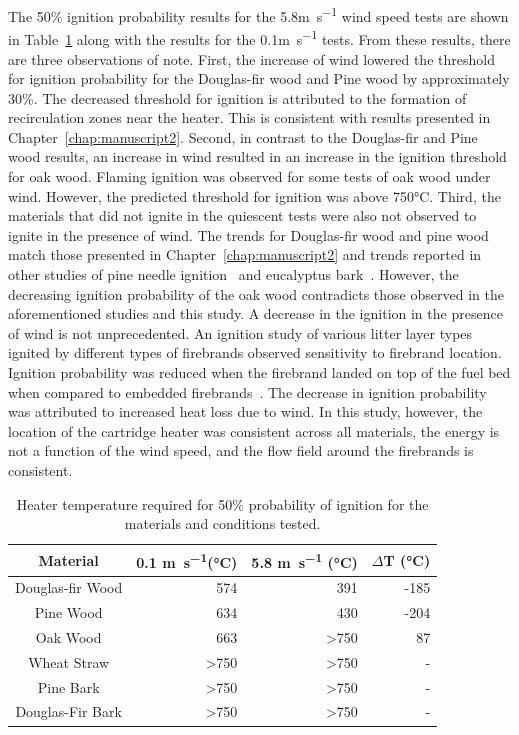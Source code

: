     The 50\% ignition probability results for the 5.8\si{\meter\per\second} wind speed tests are shown in Table~\ref{tab:composition50temp} along with the results for the 0.1\si{\meter\per\second} tests. From these results, there are three observations of note. First, the increase of wind lowered the threshold for ignition probability for the Douglas-fir wood and Pine wood by approximately 30\%. The decreased threshold for ignition  is attributed to the formation of recirculation zones near the heater. This is consistent with results presented in Chapter~\ref{chap:manuscript2}. Second, in contrast to the Douglas-fir and Pine wood results, an increase in wind resulted in an increase in the ignition threshold for oak wood. Flaming ignition was observed for some tests of oak wood under wind. However, the predicted threshold for ignition was above 750\si{\celsius}. Third, the materials that did not ignite in the quiescent tests were also not observed to ignite in the presence of wind. The trends for Douglas-fir wood and pine wood match those presented in Chapter~\ref{chap:manuscript2} and trends reported in other studies of pine needle ignition~\cite{Wang2017} and eucalyptus bark~\cite{Ellis2011, Ellis2015}. However, the decreasing ignition probability of the oak wood contradicts those observed in the aforementioned studies and this study. A decrease in the ignition in the presence of wind is not unprecedented. An ignition study of various litter layer types ignited by different types of firebrands observed sensitivity to firebrand location. Ignition probability was reduced when the firebrand landed on top of the fuel bed when compared to embedded firebrands~\cite{Plucinski2008}. The decrease in ignition probability was attributed to increased heat loss due to wind. In this study, however, the location of the cartridge heater was consistent across all materials, the energy is not a function of the wind speed, and the flow field around the firebrands is consistent.      
        \begin{table}[hpbt]
            \caption{Heater temperature required for 50\% probability of ignition for the materials and conditions tested.}
            \centering
            \begin{tabular}{crrr}
                Material & 0.1 \si{\meter\per\second}(\si{\celsius}) & 5.8 \si{\meter\per\second} (\si{\celsius}) & $\Delta$T (\si{\celsius})\\
                \hline
                Douglas-fir Wood & 574  & 391 & -185 \\
                Pine Wood        & 634  & 430 & -204\\
                Oak Wood         & 663  & \textgreater750 & 87\\
                Wheat Straw      & \textgreater750 & \textgreater750 & -\\
                Pine Bark        & \textgreater750 & \textgreater750 & -\\
                Douglas-Fir Bark & \textgreater750 & \textgreater750 & -
            \end{tabular}
            \label{tab:composition50temp}
        \end{table}
